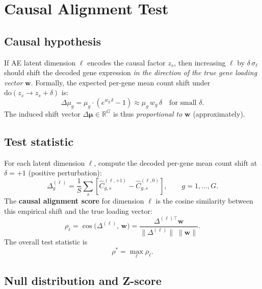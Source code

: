 \documentclass[11pt,a4paper]{article}
\newcommand{\R}{\mathbb{R}}
\newcommand{\doop}{\mathrm{do}}
\theoremstyle{definition}
\begin{document}
\section{Causal Alignment Test}
\label{sec:alignment}

\subsection{Causal hypothesis}

If AE latent dimension $\ell$ encodes the causal factor $z_s$, then
increasing $\ell$ by $\delta\,\sigma_\ell$ should shift the decoded gene
expression \emph{in the direction of the true gene loading vector}
$\bm{w}$. Formally, the expected per-gene mean count shift
under $\doop(z_s \to z_s + \delta)$ is:
\begin{equation}
  \Delta\mu_g = \mu_g \cdot (e^{w_g\,\delta} - 1)
  \approx \mu_g\,w_g\,\delta \quad \text{for small }\delta.
\end{equation}
The induced shift vector $\Delta\bm{\mu} \in \R^G$ is thus
\emph{proportional to} $\bm{w}$ (approximately).

\subsection{Test statistic}

For each latent dimension $\ell$, compute the decoded per-gene mean count
shift at $\delta = +1$ (positive perturbation):
\begin{equation}
  \Delta^{(\ell)}_g =
    \frac{1}{S}\sum_s
    \left[
      \hat{C}^{(\ell,+1)}_{g,s} - \hat{C}^{(\ell,0)}_{g,s}
    \right],
  \qquad g = 1,\ldots,G.
\end{equation}
The \textbf{causal alignment score} for dimension $\ell$ is the cosine
similarity between this empirical shift and the true loading vector:
\begin{equation}
  \rho_\ell =
    \cos\!\bigl(\Delta^{(\ell)},\, \bm{w}\bigr)
    = \frac{\Delta^{(\ell)\top}\bm{w}}
           {\|\Delta^{(\ell)}\|\;\|\bm{w}\|}.
  \label{eq:cos_align}
\end{equation}
The overall test statistic is
\begin{equation}
  \rho^* = \max_\ell \rho_\ell.
  \label{eq:rho_star}
\end{equation}

\subsection{Null distribution and Z-score}
\end{document}

